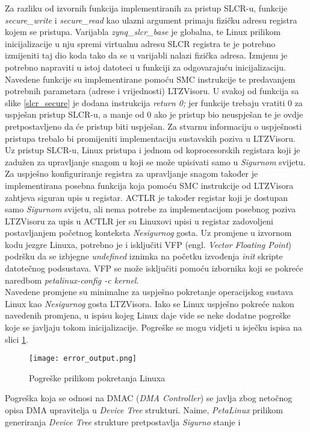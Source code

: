\documentclass[times, utf8, diplomski, numeric]{fer}
\begin{document}
Za razliku od izvornih funkcija implementiranih za pristup SLCR-u, funkcije \textit{secure\_write} i \textit{secure\_read} kao
ulazni argument primaju fizičku adresu registra kojem se pristupa. Varijabla \textit{zynq\_slcr\_base} je globalna, te Linux
prilikom inicijalizacije u nju spremi virtualnu adresu SLCR registra te je potrebno izmijeniti taj dio koda tako da se u
varijabli nalazi fizička adresa. Izmjenu je potrebno napraviti u istoj datoteci u funkciji za odgovarajuću inicijalizaciju.
Navedene funkcije su implementirane pomoću SMC instrukcije te predavanjem potrebnih parametara (adrese i vrijednosti) LTZVisoru.
U svakoj od funkcija sa slike \ref{slcr_secure} je dodana instrukcija \textit{return 0;} jer funkcije trebaju vratiti 0 za
uspješan pristup SLCR-u, a manje od 0 ako je pristup bio neuspješan te je ovdje pretpostavljeno da će pristup biti uspješan.
Za stvarnu informaciju o uspješnosti pristupa trebalo bi promijeniti implementaciju sustavskih poziva u LTZVisoru.
Uz pristup SLCR-u, Linux pristupa i jednom od koprocesorskih registara koji je zadužen za upravljanje snagom u koji se može
upisivati samo u \textit{Sigurnom} svijetu. Za uspješno konfiguriranje registra za upravljanje snagom također je implementirana posebna
funkcija koja pomoću SMC instrukcije od LTZVisora zahtjeva siguran upis u registar. ACTLR je također registar koji je dostupan
samo \textit{Sigurnom} svijetu, ali nema potrebe za implementacijom posebnog poziva LTZVisoru za upis u ACTLR jer su Linuxovi upisi u
registar zadovoljeni postavljanjem početnog konteksta \textit{Nesigurnog} gosta.
Uz promjene u izvornom kodu jezgre Linuxa, potrebno je i isključiti VFP (engl. \textit{Vector Floating Point}) podršku da se
izbjegne \textit{undefined} iznimka na početku izvođenja \textit{init} skripte datotečnog podsustava. VFP se može isključiti
pomoću izbornika koji se pokreće naredbom \textit{petalinux-config -c kernel}.\\
Navedene promjene su minimalne za uspješno pokretanje operacijskog sustava Linux kao \textit{Nesigurnog} gosta LTZVisora. Iako se Linux
uspješno pokreće nakon navedenih promjena, u ispisu kojeg Linux daje vide se neke dodatne pogreške koje se javljaju tokom
inicijalizacije. Pogreške se mogu vidjeti u isječku ispisa na slici \ref{plnx_errors}.
\begin{figure}[H]
  \centering
  \texttt{[image: error\_output.png]}
  \caption{Pogreške prilikom pokretanja Linuxa}
  \label{plnx_errors}
\end{figure}
Pogreška koja se odnosi na DMAC (\textit{DMA Controller}) se javlja zbog netočnog opisa DMA upravitelja u \textit{Device
Tree} strukturi. Naime, \textit{PetaLinux} prilikom generiranja \textit{Device Tree} strukture pretpostavlja \textit{Sigurno} stanje i
\end{document}
